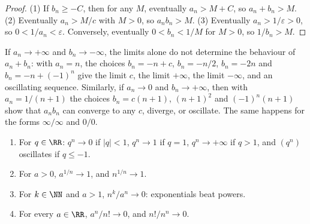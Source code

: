 \begin{proof}
(1) If $b_n \geq -C$, then for any $M$, eventually $a_n > M + C$, so $a_n + b_n > M$. (2) Eventually $a_n > M/c$ with $M > 0$, so $a_nb_n > M$. (3) Eventually $a_n > 1/\varepsilon > 0$, so
$0 < 1/a_n < \varepsilon$. Conversely, eventually $0 < b_n < 1/M$ for $M > 0$, so $1/b_n > M$.
\end{proof}

\begin{counterexample}\label{real-analysis:counterexample-indeterminate}
If $a_n \to +\infty$ and $b_n \to -\infty$, the limits alone do not determine the behaviour of $a_n + b_n$: with $a_n = n$, the choices $b_n = -n + c$, $b_n = -n/2$, $b_n = -2n$ and $b_n = -n + (-1)^n$ give
the limit $c$, the limit $+\infty$, the limit $-\infty$, and an oscillating sequence. Similarly, if $a_n \to 0$ and $b_n \to +\infty$, then with $a_n = 1/(n+1)$ the choices $b_n = c(n + 1)$, $(n + 1)^2$ and
$(-1)^n(n + 1)$ show that $a_nb_n$ can converge to any $c$, diverge, or oscillate. The same happens for the forms $\infty/\infty$ and $0/0$.
\end{counterexample}

\begin{proposition}\label{real-analysis:proposition-fundamental-limits}
\begin{enumerate}
\item For $q \in \RR$: $q^n \to 0$ if $|q| < 1$, $q^n \to 1$ if $q = 1$, $q^n \to +\infty$ if $q > 1$, and $(q^n)$ oscillates if $q \leq -1$.
\item For $a > 0$, $a^{1/n} \to 1$, and $n^{1/n} \to 1$.
\item For $k \in \NN$ and $a > 1$, $n^k/a^n \to 0$: exponentials beat powers.
\item For every $a \in \RR$, $a^n/n! \to 0$, and $n!/n^n \to 0$.
\end{enumerate}
\end{proposition}

